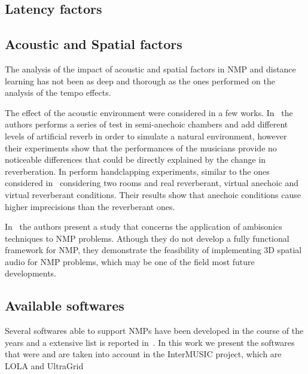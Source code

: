\subsection{Latency factors}
\subsection{Acoustic and Spatial factors}
The analysis of the impact of acoustic and spatial factors in NMP and distance learning has not been as deep and thorough as the ones performed on the analysis of the tempo effects. 

The effect of the acoustic environment were considered in a few works. In~\cite{carot2009towards} the authors performs a series of test in semi-anechoic chambers and add different levels of artificial reverb in order to simulate a natural environment, however their experiments show that the performances of the musicians provide no noticeable differences that could be directly explained by the change in reverberation. In \cite{FarnerReverb} perform handclapping experiments, similar to the ones considered in~\cite{Chafe1} considering two rooms and real reverberant, virtual anechoic and virtual reverberant conditions. Their results show that anechoic conditions cause higher imprecisions than the reverberant ones.



In~\cite{gurevich2011ambisonic} the authors present a study that concerns the application of ambisonics techniques to NMP problems. Athough they do not develop a fully functional framework for NMP, they demonstrate the feasibility of implementing 3D spatial audio for NMP problems, which may be one of the field most future developments.


\subsection{Available softwares}
Several softwares able to support NMPs have been developed in the course of the years and a extensive list is reported in~\cite{RottondiOverview}. In this work we present the softwares that were and are taken into account in the InterMUSIC project, which are  LOLA\cite{drioli2013networked} and UltraGrid 